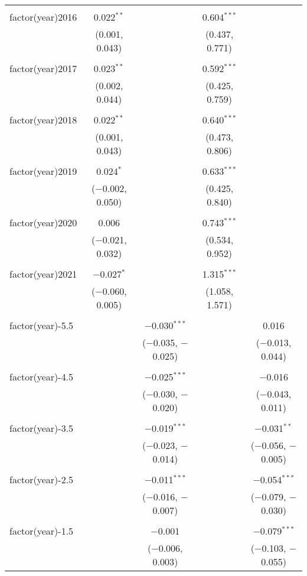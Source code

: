 \begin{table}[!htbp]
\begin{tabular}{@{\extracolsep{5pt}}lcccc}
  & & & & \\ 
 factor(year)2016 & 0.022$^{**}$ &  & 0.604$^{***}$ &  \\ 
  & (0.001, 0.043) &  & (0.437, 0.771) &  \\ 
  & & & & \\ 
 factor(year)2017 & 0.023$^{**}$ &  & 0.592$^{***}$ &  \\ 
  & (0.002, 0.044) &  & (0.425, 0.759) &  \\ 
  & & & & \\ 
 factor(year)2018 & 0.022$^{**}$ &  & 0.640$^{***}$ &  \\ 
  & (0.001, 0.043) &  & (0.473, 0.806) &  \\ 
  & & & & \\ 
 factor(year)2019 & 0.024$^{*}$ &  & 0.633$^{***}$ &  \\ 
  & ($-$0.002, 0.050) &  & (0.425, 0.840) &  \\ 
  & & & & \\ 
 factor(year)2020 & 0.006 &  & 0.743$^{***}$ &  \\ 
  & ($-$0.021, 0.032) &  & (0.534, 0.952) &  \\ 
  & & & & \\ 
 factor(year)2021 & $-$0.027$^{*}$ &  & 1.315$^{***}$ &  \\ 
  & ($-$0.060, 0.005) &  & (1.058, 1.571) &  \\ 
  & & & & \\ 
 factor(year)-5.5 &  & $-$0.030$^{***}$ &  & 0.016 \\ 
  &  & ($-$0.035, $-$0.025) &  & ($-$0.013, 0.044) \\ 
  & & & & \\ 
 factor(year)-4.5 &  & $-$0.025$^{***}$ &  & $-$0.016 \\ 
  &  & ($-$0.030, $-$0.020) &  & ($-$0.043, 0.011) \\ 
  & & & & \\ 
 factor(year)-3.5 &  & $-$0.019$^{***}$ &  & $-$0.031$^{**}$ \\ 
  &  & ($-$0.023, $-$0.014) &  & ($-$0.056, $-$0.005) \\ 
  & & & & \\ 
 factor(year)-2.5 &  & $-$0.011$^{***}$ &  & $-$0.054$^{***}$ \\ 
  &  & ($-$0.016, $-$0.007) &  & ($-$0.079, $-$0.030) \\ 
  & & & & \\ 
 factor(year)-1.5 &  & $-$0.001 &  & $-$0.079$^{***}$ \\ 
  &  & ($-$0.006, 0.003) &  & ($-$0.103, $-$0.055) \\ 

\end{tabular}
\end{table}
